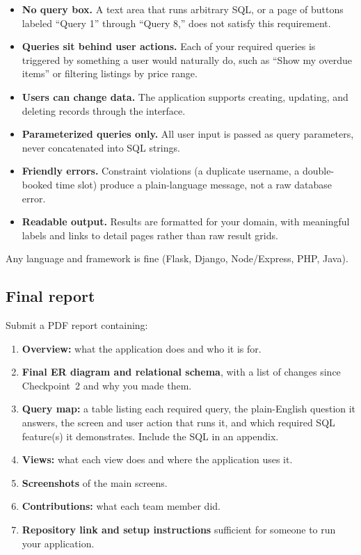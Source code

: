 \documentclass[11pt]{article}
\begin{document}
\begin{itemize}
  \item \textbf{No query box.} A text area that runs arbitrary SQL, or a page of buttons labeled ``Query 1'' through ``Query 8,'' does not satisfy this requirement.
  \item \textbf{Queries sit behind user actions.} Each of your required queries is triggered by something a user would naturally do, such as ``Show my overdue items'' or filtering listings by price range.
  \item \textbf{Users can change data.} The application supports creating, updating, and deleting records through the interface. 
  \item \textbf{Parameterized queries only.} All user input is passed as query parameters, never concatenated into SQL strings.
  \item \textbf{Friendly errors.} Constraint violations (a duplicate username, a double-booked time slot) produce a plain-language message, not a raw database error.
  \item \textbf{Readable output.} Results are formatted for your domain, with meaningful labels and links to detail pages rather than raw result grids.
\end{itemize}

\noindent Any language and framework is fine (Flask, Django, Node/Express, PHP, Java).

\subsection{Final report}

Submit a PDF report containing:
\begin{enumerate}
  \item \textbf{Overview:} what the application does and who it is for.
  \item \textbf{Final ER diagram and relational schema}, with a list of changes since Checkpoint~2 and why you made them.
  \item \textbf{Query map:} a table listing each required query, the plain-English question it answers, the screen and user action that runs it, and which required SQL feature(s) it demonstrates. Include the SQL in an appendix.
  \item \textbf{Views:} what each view does and where the application uses it.
  \item \textbf{Screenshots} of the main screens.
  \item \textbf{Contributions:} what each team member did.
  \item \textbf{Repository link and setup instructions} sufficient for someone to run your application.
\end{enumerate}
\end{document}
